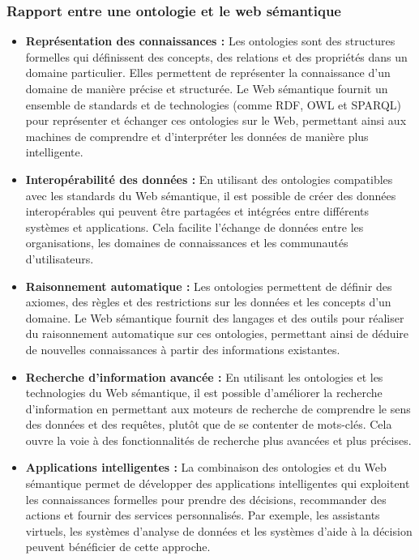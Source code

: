 \documentclass{article}
\begin{document}
	\subsubsection{Rapport entre une ontologie et le web sémantique}
	\begin{itemize}
		\item \textbf{Représentation des connaissances :} Les ontologies sont des structures formelles qui définissent des concepts, des relations et des propriétés dans un domaine particulier. Elles permettent de représenter la connaissance d'un domaine de manière précise et structurée. Le Web sémantique fournit un ensemble de standards et de technologies (comme RDF, OWL et SPARQL) pour représenter et échanger ces ontologies sur le Web, permettant ainsi aux machines de comprendre et d'interpréter les données de manière plus intelligente.
		
		\item \textbf{Interopérabilité des données :} En utilisant des ontologies compatibles avec les standards du Web sémantique, il est possible de créer des données interopérables qui peuvent être partagées et intégrées entre différents systèmes et applications. Cela facilite l'échange de données entre les organisations, les domaines de connaissances et les communautés d'utilisateurs.
		
		\item \textbf{Raisonnement automatique :} Les ontologies permettent de définir des axiomes, des règles et des restrictions sur les données et les concepts d'un domaine. Le Web sémantique fournit des langages et des outils pour réaliser du raisonnement automatique sur ces ontologies, permettant ainsi de déduire de nouvelles connaissances à partir des informations existantes.
		
		\item \textbf{Recherche d'information avancée :} En utilisant les ontologies et les technologies du Web sémantique, il est possible d'améliorer la recherche d'information en permettant aux moteurs de recherche de comprendre le sens des données et des requêtes, plutôt que de se contenter de mots-clés. Cela ouvre la voie à des fonctionnalités de recherche plus avancées et plus précises.
		
		\item \textbf{Applications intelligentes :} La combinaison des ontologies et du Web sémantique permet de développer des applications intelligentes qui exploitent les connaissances formelles pour prendre des décisions, recommander des actions et fournir des services personnalisés. Par exemple, les assistants virtuels, les systèmes d'analyse de données et les systèmes d'aide à la décision peuvent bénéficier de cette approche.
	\end{itemize}
	
\end{document}
